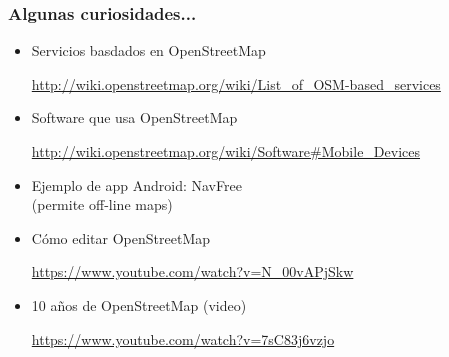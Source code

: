 \begin{frame}
\frametitle{Algunas curiosidades...}

\begin{itemize}
\item Servicios basdados en OpenStreetMap \\
  \begin{footnotesize}
  \url{http://wiki.openstreetmap.org/wiki/List_of_OSM-based_services} 
  \end{footnotesize}
\item Software que usa OpenStreetMap \\
  \begin{footnotesize}
  \url{http://wiki.openstreetmap.org/wiki/Software\#Mobile_Devices} 
  \end{footnotesize}
\item Ejemplo de app Android: NavFree \\
  (permite off-line maps) 
\item Cómo editar OpenStreetMap \\
  \begin{footnotesize}
  \url{https://www.youtube.com/watch?v=N_00vAPjSkw} 
  \end{footnotesize}
\item 10 años de OpenStreetMap (video) \\
  \begin{footnotesize}
  \url{https://www.youtube.com/watch?v=7sC83j6vzjo} 
  \end{footnotesize}
\end{itemize}

\end{frame}

